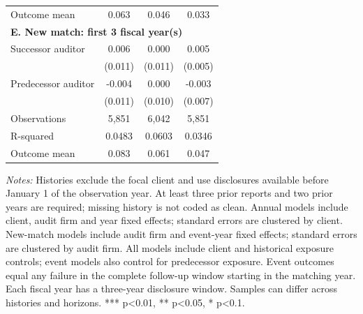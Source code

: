 \begin{table}[htbp]
\begin{threeparttable}
\begin{tabular}{p{}ccc}
Outcome mean & 0.063 & 0.046 & 0.033 \\
\multicolumn{4}{l}{\textbf{E. New match: first 3 fiscal year(s)}} \\
Successor auditor & 0.006 & 0.000 & 0.005 \\
 & (0.011) & (0.011) & (0.005) \\
Predecessor auditor & -0.004 & 0.000 & -0.003 \\
 & (0.011) & (0.010) & (0.007) \\
Observations & 5,851 & 6,042 & 5,851 \\
R-squared & 0.0483 & 0.0603 & 0.0346 \\
Outcome mean & 0.083 & 0.061 & 0.047 \\
\bottomrule
\end{tabular}
\begin{tablenotes}\footnotesize
\item \raggedright \textit{Notes:} Histories exclude the focal client and use disclosures available before January 1 of the observation year. At least three prior reports and two prior years are required; missing history is not coded as clean. Annual models include client, audit firm and year fixed effects; standard errors are clustered by client. New-match models include audit firm and event-year fixed effects; standard errors are clustered by audit firm. All models include client and historical exposure controls; event models also control for predecessor exposure. Event outcomes equal any failure in the complete follow-up window starting in the matching year. Each fiscal year has a three-year disclosure window. Samples can differ across histories and horizons. *** p<0.01, ** p<0.05, * p<0.1.
\end{tablenotes}
\end{threeparttable}
\end{table}
